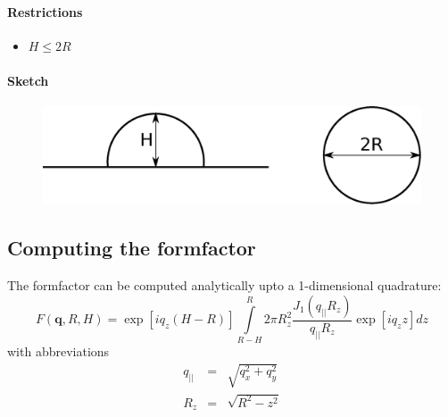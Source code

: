 \paragraph{Restrictions}
\begin{itemize}
\item $H\leq 2R$
\end{itemize}


\par
\paragraph{Sketch}
\begin{figure}[H]
\begin{center}
\includegraphics[width=0.6\columnwidth]{Figures/sphere}
\end{center}
\label{sphere}
\end{figure}

\subsection{Computing the formfactor}
The formfactor can be computed analytically upto a 1-dimensional quadrature:
\begin{equation}
F(\mathbf q, R, H) = \exp\left[iq_z\left(H-R\right)\right]\int\limits_{R-H}^{R}{2\pi R_z^2\frac{J_1(q_{||}R_z)}{q_{||}R_z}\exp\left[iq_zz\right]dz} 
\label{eq:ffsphere}
\end{equation}
with abbreviations
\begin{eqnarray}
q_{||} &=& \sqrt{q_x^2+q_y^2} \\
R_z &=& \sqrt{R^2-z^2} 
\end{eqnarray}

